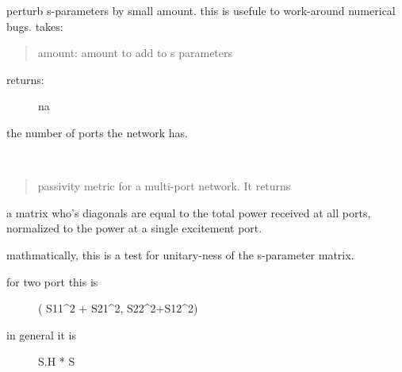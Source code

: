 \documentclass[letterpaper,10pt,english]{sphinxmanual}
\begin{document}
\begin{fulllineitems}
\begin{fulllineitems}
\label{auto_network:mwavepy.Network.nudge}
perturb s-parameters by small amount. this is usefule to work-around
numerical bugs.
takes:
\begin{quote}

amount: amount to add to s parameters
\end{quote}
\begin{description}
\item[{returns:}] \leavevmode
na

\end{description}

\end{fulllineitems}


\begin{fulllineitems}
\label{auto_network:mwavepy.Network.number_of_ports}
the number of ports the network has.

\end{fulllineitems}


\begin{fulllineitems}
\label{auto_network:mwavepy.Network.passivity}~\begin{quote}

passivity metric for a multi-port network. It returns
\end{quote}

a matrix who's diagonals are equal to the total power 
received at all ports, normalized to the power at a single
excitement  port.

mathmatically, this is a test for unitary-ness of the 
s-parameter matrix.
\begin{description}
\item[{for two port this is }] \leavevmode
( {\color{red}\bfseries{}\textbar{}}S11\textbar{}\textasciicircum{}2 + {\color{red}\bfseries{}\textbar{}}S21\textbar{}\textasciicircum{}2, {\color{red}\bfseries{}\textbar{}}S22\textbar{}\textasciicircum{}2+\textbar{}S12\textbar{}\textasciicircum{}2)

\item[{in general it is  }] \leavevmode
S.H * S

\end{description}


\end{fulllineitems}
\end{fulllineitems}
\end{document}
